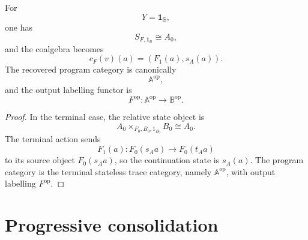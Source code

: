 \begin{corollary}
\label{cor:poly-relative-terminal-stateless-coalgebra}
For
\[
Y=\mathbf 1_{\mathbb B},
\]
one has
\[
S_{F,\mathbf 1_{\mathbb B}}\cong A_0,
\]
and the coalgebra becomes
\[
c_F(v)(a)=(F_1(a),s_A(a)).
\]
The recovered program category is canonically
\[
\mathbb A^{\mathrm{op}},
\]
and the output labelling functor is
\[
F^{\mathrm{op}}:\mathbb A^{\mathrm{op}}\to\mathbb B^{\mathrm{op}}.
\]
\end{corollary}

\begin{proof}
In the terminal case, the relative state object is
\[
A_0\times_{F_0,B_0,1_{B_0}}B_0\cong A_0.
\]
The terminal action sends
\[
F_1(a):F_0(s_Aa)\to F_0(t_Aa)
\]
to its source object \(F_0(s_Aa)\), so the continuation state is
\(s_A(a)\).  The program category is the terminal stateless trace category,
namely \(\mathbb A^{\mathrm{op}}\), with output labelling \(F^{\mathrm{op}}\).
\end{proof}

\section{Progressive consolidation}
\label{sec:poly-relative-progressive-consolidation}

